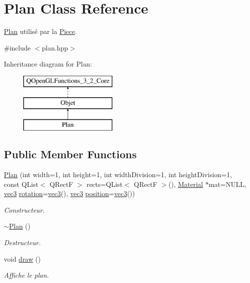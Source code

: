 \hypertarget{class_plan}{\section{Plan Class Reference}
\label{class_plan}
}


\hyperlink{class_plan}{Plan} utilisé par la \hyperlink{class_piece}{Piece}.  




{\ttfamily \#include $<$plan.\+hpp$>$}

Inheritance diagram for Plan\+:\begin{figure}[H]
\begin{center}
\leavevmode
\includegraphics[height=3.000000cm]{class_plan}
\end{center}
\end{figure}
\subsection*{Public Member Functions}
\begin{DoxyCompactItemize}
\item 
\hyperlink{class_plan_ab74eeb948e40ade24bd54a60a4ece8c6}{Plan} (int width=1, int height=1, int width\+Division=1, int height\+Division=1, const Q\+List$<$ Q\+Rect\+F $>$ rects=Q\+List$<$ Q\+Rect\+F $>$(), \hyperlink{class_material}{Material} $\ast$mat=N\+U\+L\+L, \hyperlink{structvec3}{vec3} \hyperlink{class_objet_ac69a1b459bcb4433099c8cfbff06b209}{rotation}=\hyperlink{structvec3}{vec3}(), \hyperlink{structvec3}{vec3} \hyperlink{class_objet_a0e109bc790b14328202dd2546b04e2fd}{position}=\hyperlink{structvec3}{vec3}())
\begin{DoxyCompactList}\small\item\em Constructeur. \end{DoxyCompactList}\item 
\hyperlink{class_plan_a4df05d0211ed4572125f79cbfaafa626}{$\sim$\+Plan} ()
\begin{DoxyCompactList}\small\item\em Destructeur. \end{DoxyCompactList}\item 
void \hyperlink{class_plan_a513c3dec0ce9043a9e1d3b5b18a6d698}{draw} ()
\begin{DoxyCompactList}\small\item\em Affiche le plan. \end{DoxyCompactList}\end{DoxyCompactItemize}
